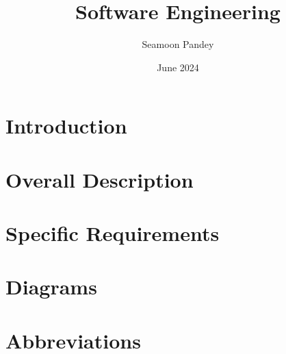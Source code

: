 \documentclass[a4paper,12pt]{report}
\title{Software Engineering}
\author{Seamoon Pandey}
\date{June 2024}
\begin{document}



\tableofcontents
\thispagestyle{empty}
\addtocounter{page}{-1}
\newpage


\chapter{Introduction}%
\label{introduction}%

\newpage

\chapter{Overall Description}%
\label{description}%

\newpage

\chapter{Specific Requirements}%
\label{requirements}

\newpage
\chapter{Diagrams}%
\label{diagrams}

\newpage

\chapter*{Abbreviations}%
%
\label{abbreviations}%

\end{document}
